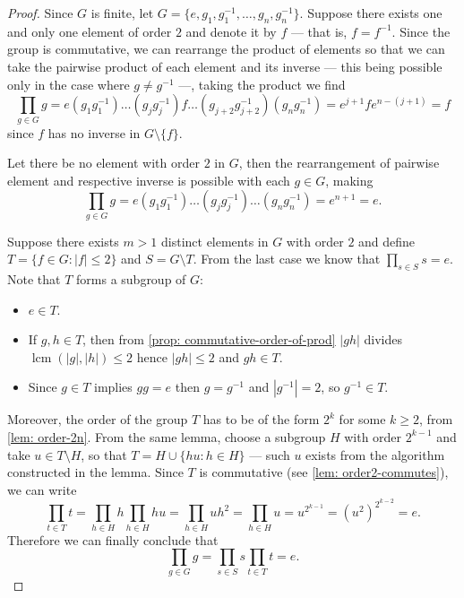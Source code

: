 \begin{proof}
  Since \(G\) is finite, let \(G = \{e, g_1, g_1^{-1}, \dots, g_n, g_n^{-1}\}\).
  Suppose there exists one and only one element of order \(2\) and denote it by
  \(f\) --- that is, \(f = f^{-1}\). Since the group is commutative, we can
  rearrange the product of elements so that we can take the pairwise product of
  each element and its inverse --- this being possible only in the case where
  \(g \neq g^{-1}\) ---, taking the product we find
  \[
    \prod_{g \in G} g = e (g_1 g_1^{-1}) \dots (g_j g_j^{-1}) f \dots (g_{j + 2}
    g_{j + 2}^{-1}) (g_n g_n^{-1}) = e^{j + 1} f e^{n - (j + 1)} = f
  \]
  since \(f\) has no inverse in \(G \setminus \{f\}\).

  Let there be no element with order \(2\) in \(G\), then the rearrangement of
  pairwise element and respective inverse is possible with each \(g \in G\),
  making
  \[
    \prod_{g \in G} g = e (g_1 g_1^{-1}) \dots (g_j g_j^{-1}) \dots (g_n
    g_n^{-1}) = e^{n + 1} = e.
  \]

  Suppose there exists \(m > 1\) distinct elements in \(G\) with order \(2\) and
  define \(T = \{f \in G: |f| \leq 2\}\) and \(S = G \setminus T\). From the
  last case we know that \(\prod_{s \in S} s = e\). Note that \(T\) forms a
  subgroup of \(G\):
  \begin{itemize}
    \item \(e \in T\).
    \item If \(g, h \in T\), then from \cref{prop: commutative-order-of-prod}
      \(|gh|\) divides \(\operatorname{lcm}(|g|, |h|) \leq 2\) hence \(|gh| \leq
      2\) and \(gh \in T\).
    \item Since \(g \in T\) implies \(g g = e\) then \(g = g^{-1}\) and
      \(|g^{-1}| = 2\), so \(g^{-1} \in T\).
  \end{itemize}
  Moreover, the order of the group \(T\) has to be of the form \(2^k\) for some
  \(k \geq 2\), from \cref{lem: order-2n}. From the same lemma, choose a
  subgroup \(H\) with order \(2^{k-1}\) and take \(u \in T \setminus H\), so
  that \(T = H \cup \{hu: h \in H\}\) --- such \(u\) exists from the algorithm
  constructed in the lemma. Since \(T\) is commutative (see \cref{lem:
  order2-commutes}), we can write
  \[
    \prod_{t \in T} t = \prod_{h \in H} h \prod_{h \in H} hu = \prod_{h \in H} u
    h^2 = \prod_{h \in H} u = u^{2^{k-1}} = (u^2)^{2^{k-2}} = e.
  \]
  Therefore we can finally conclude that
  \[
    \prod_{g \in G} g = \prod_{s \in S} s \prod_{t \in T} t = e.
  \]
\end{proof}
